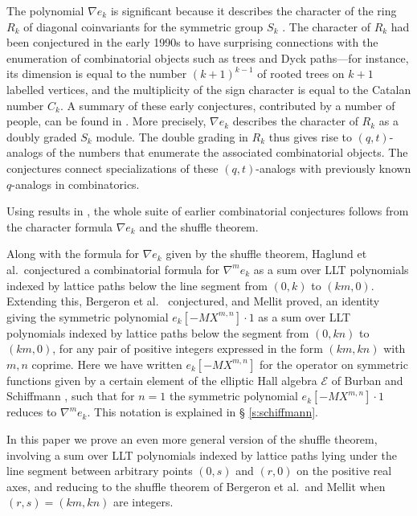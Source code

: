 \documentclass[12pt]{amsart}
\theoremstyle{definition}
\theoremstyle{remark}
\newcommand{\Ecal}{{\mathcal E}}
\begin{document}
The polynomial $\nabla e_{k}$ is significant because it describes the
character of the ring $R_{k}$ of diagonal coinvariants for the
symmetric group $S_{k}$ \cite[Proposition 3.5]{Haiman02}.  The
character of $R_{k}$ had been conjectured in the early 1990s to have
surprising connections with the enumeration of combinatorial objects
such as trees and Dyck paths---for instance, its dimension is equal to
the number $(k+1)^{k-1}$ of rooted trees on $k+1$ labelled vertices,
and the multiplicity of the sign character is equal to the Catalan
number $C_{k}$.  A summary of these early conjectures, contributed by
a number of people, can be found in \cite{Haiman94}.  More precisely,
$\nabla e_{k}$ describes the character of $R_{k}$ as a doubly graded
$S_{k}$ module.  The double grading in $R_{k}$ thus gives rise to
$(q,t)$-analogs of the numbers that enumerate the associated
combinatorial objects.  The conjectures connect specializations of
these $(q,t)$-analogs with previously known $q$-analogs in
combinatorics.

Using results in \cite{GarsHaim96}, the whole suite of earlier
combinatorial conjectures follows from the character formula $\nabla
e_{k}$ and the shuffle theorem.

Along with the formula for $\nabla e_{k}$ given by the shuffle
theorem, Haglund et al.\ conjectured a combinatorial formula for
$\nabla ^{m} e_{k}$ as a sum over LLT polynomials indexed by lattice
paths below the line segment from $(0,k)$ to $(km,0)$.  Extending
this, Bergeron et al.\ \cite{BeGaSeXi16} conjectured, and Mellit
\cite{Mellit16} proved, an identity giving the symmetric polynomial
$e_{k}[-M X^{m,n}]\cdot 1$ as a sum over LLT polynomials indexed by
lattice paths below the segment from $(0,kn)$ to $(km,0)$, for any
pair of positive integers expressed in the form $(km,kn)$ with $m,n$
coprime.  Here we have written $e_{k}[-M X^{m,n}]$ for the operator on
symmetric functions given by a certain element of the elliptic Hall
algebra $\Ecal $ of Burban and Schiffmann \cite{BurbSchi12}, such that
for $n=1$ the symmetric polynomial $e_{k}[-M X^{m,n}]\cdot 1$ reduces
to $\nabla ^{m} e_{k}$.  This notation is explained in \S
\ref{s:schiffmann}.

In this paper we prove an even more general version of the shuffle
theorem, involving a sum over LLT polynomials indexed by lattice paths
lying under the line segment between arbitrary points $(0,s)$ and
$(r,0)$ on the positive real axes, and reducing to the shuffle theorem
of Bergeron et al.\ and Mellit when $(r,s) = (km,kn)$ are integers.
\end{document}
